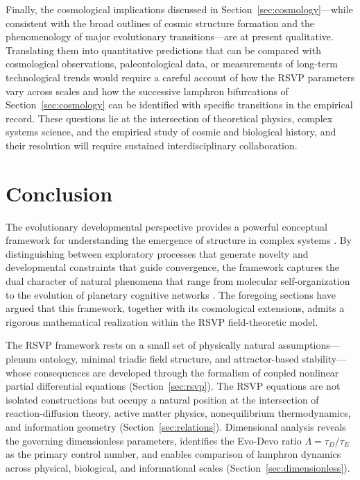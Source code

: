 \documentclass[12pt]{article}
\begin{document}
Finally, the cosmological implications discussed in Section~\ref{sec:cosmology}---while consistent with the broad outlines of cosmic structure formation and the phenomenology of major evolutionary transitions---are at present qualitative. Translating them into quantitative predictions that can be compared with cosmological observations, paleontological data, or measurements of long-term technological trends would require a careful account of how the RSVP parameters vary across scales and how the successive lamphron bifurcations of Section~\ref{sec:cosmology} can be identified with specific transitions in the empirical record. These questions lie at the intersection of theoretical physics, complex systems science, and the empirical study of cosmic and biological history, and their resolution will require sustained interdisciplinary collaboration.

\section{Conclusion}
\label{sec:conclusion}

The evolutionary developmental perspective provides a powerful conceptual framework for understanding the emergence of structure in complex systems \cite{smart2009,smart2023}. By distinguishing between exploratory processes that generate novelty and developmental constraints that guide convergence, the framework captures the dual character of natural phenomena that range from molecular self-organization \cite{kauffman1993,smithmorowitz2016} to the evolution of planetary cognitive networks \cite{dechardin1955,smart2023}. The foregoing sections have argued that this framework, together with its cosmological extensions, admits a rigorous mathematical realization within the RSVP field-theoretic model.

The RSVP framework rests on a small set of physically natural assumptions---plenum ontology, minimal triadic field structure, and attractor-based stability---whose consequences are developed through the formalism of coupled nonlinear partial differential equations (Section~\ref{sec:rsvp}). The RSVP equations are not isolated constructions but occupy a natural position at the intersection of reaction-diffusion theory, active matter physics, nonequilibrium thermodynamics, and information geometry (Section~\ref{sec:relations}). Dimensional analysis reveals the governing dimensionless parameters, identifies the Evo-Devo ratio $\Lambda = \tau_D/\tau_E$ as the primary control number, and enables comparison of lamphron dynamics across physical, biological, and informational scales (Section~\ref{sec:dimensionless}).
\end{document}
